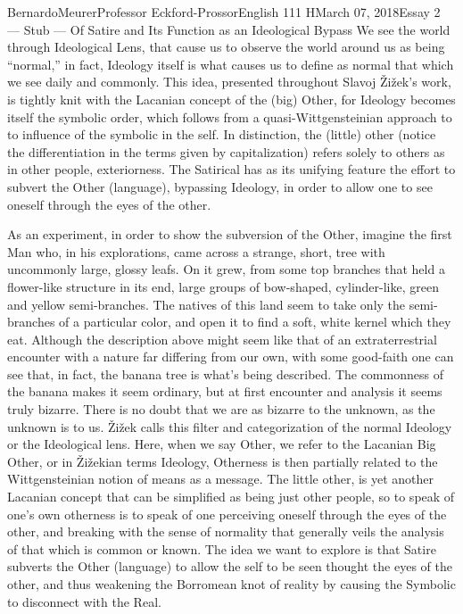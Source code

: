 \documentclass[12pt,letterpaper]{article}
\begin{document}
\begin{mla}{Bernardo}{Meurer}{Professor Eckford-Prossor}{English 111 H}{March 07, 2018}{Essay 2 --- Stub --- Of Satire and Its Function as an Ideological Bypass}
    We see the world through Ideological Lens, that cause us to observe the world around us as being ``normal,'' in fact, Ideology itself is what causes us to define as normal that which we see daily and commonly. This idea, presented throughout Slavoj Žižek's work, is tightly knit with the Lacanian concept of the (big) Other, for Ideology becomes itself the symbolic order, which follows from a quasi-Wittgensteinian approach to to influence of the symbolic in the self. In distinction, the (little) other (notice the differentiation in the terms given by capitalization) refers solely to others as in other people, exteriorness. The Satirical has as its unifying feature the effort to subvert the Other (language), bypassing Ideology, in order to allow one to see oneself through the eyes of the other.

    As an experiment, in order to show the subversion of the Other, imagine the first Man who, in his explorations, came across a strange, short, tree with uncommonly large, glossy leafs. On it grew, from some top branches that held a flower-like structure in its end, large groups of bow-shaped, cylinder-like, green and yellow semi-branches. The natives of this land seem to take only the semi-branches of a particular color, and open it to find a soft, white kernel which they eat. Although the description above might seem like that of an extraterrestrial encounter with a nature far differing from our own, with some good-faith one can see that, in fact, the banana tree is what's being described. The commonness of the banana makes it seem ordinary, but at first encounter and analysis it seems truly bizarre. There is no doubt that we are as bizarre to the unknown, as the unknown is to us. Žižek calls this filter and categorization of the normal  Ideology or the Ideological lens. Here, when we say Other, we refer to the Lacanian Big Other, or in Žižekian terms Ideology, Otherness is then partially related to the Wittgensteinian notion of means as a message. The little other, is yet another Lacanian concept that can be simplified as being just other people, so to speak of one's own otherness is to speak of one perceiving oneself through the eyes of the other, and breaking with the sense of normality that generally veils the analysis of that which is common or known. The idea we want to explore is that Satire subverts the Other (language) to allow the self to be seen thought the eyes of the other, and thus weakening the Borromean knot of reality by causing the Symbolic to disconnect with the Real.


\end{mla}
\end{document}
